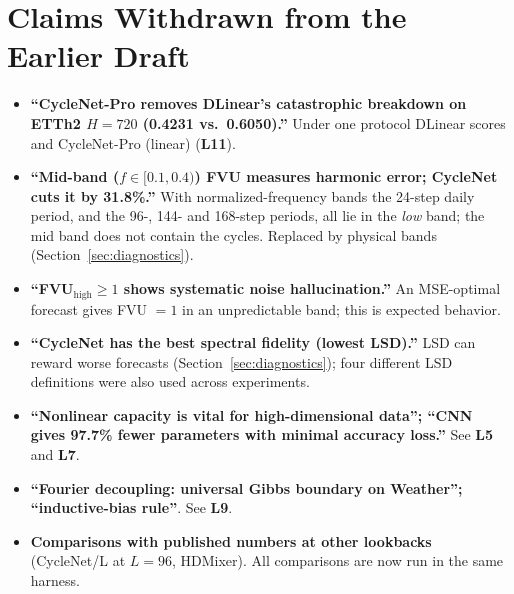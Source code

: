 \documentclass[11pt,a4paper]{article}
\newcommand{\lrn}[1]{\textbf{L#1}}
\begin{document}
\section{Claims Withdrawn from the Earlier Draft}
\label{sec:removed}
\begin{itemize}
    \item \textbf{``CycleNet-Pro removes DLinear's catastrophic breakdown on ETTh2 $H{=}720$ (0.4231 vs.\ 0.6050).''} Under one protocol DLinear scores \dlinearEtthTwoSevenTwenty{} and CycleNet-Pro (linear) \cycLinEtthTwoSevenTwenty{} (\lrn{11}).
    \item \textbf{``Mid-band ($f\in[0.1,0.4)$) FVU measures harmonic error; CycleNet cuts it by 31.8\%.''} With normalized-frequency bands the 24-step daily period, and the 96-, 144- and 168-step periods, all lie in the \emph{low} band; the mid band does not contain the cycles. Replaced by physical bands (Section~\ref{sec:diagnostics}).
    \item \textbf{``FVU$_\text{high}\ge 1$ shows systematic noise hallucination.''} An MSE-optimal forecast gives FVU $=1$ in an unpredictable band; this is expected behavior.
    \item \textbf{``CycleNet has the best spectral fidelity (lowest LSD).''} LSD can reward worse forecasts (Section~\ref{sec:diagnostics}); four different LSD definitions were also used across experiments.
    \item \textbf{``Nonlinear capacity is vital for high-dimensional data''; ``CNN gives 97.7\% fewer parameters with minimal accuracy loss.''} See \lrn{5} and \lrn{7}.
    \item \textbf{``Fourier decoupling: universal Gibbs boundary on Weather''; ``inductive-bias rule''}. See \lrn{9}.
    \item \textbf{Comparisons with published numbers at other lookbacks} (CycleNet/L at $L{=}96$, HDMixer). All comparisons are now run in the same harness.
\end{itemize}
\end{document}
